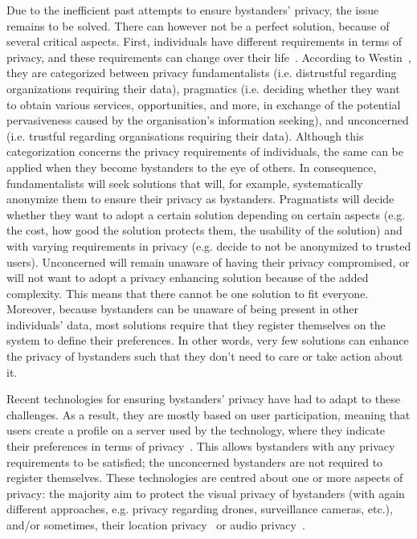 \documentclass[conference]{IEEEtran}
\begin{document}
Due to the inefficient past attempts to ensure bystanders' privacy, the issue remains to be solved. There can however not be a perfect solution, because of several critical aspects. First, individuals have different requirements in terms of privacy, and these requirements can change over their life~\cite{shu2016cardea}. According to Westin~\cite{langheinrich2009privacy}, they are categorized between privacy fundamentalists (i.e. distrustful regarding organizations requiring their data), pragmatics (i.e. deciding whether they want to obtain various services, opportunities, and more, in exchange of the potential pervasiveness caused by the organisation's information seeking), and unconcerned (i.e. trustful regarding organisations requiring their data). Although this categorization concerns the privacy requirements of individuals, the same can be applied when they become bystanders to the eye of others. In consequence, fundamentalists will seek solutions that will, for example, systematically anonymize them to ensure their privacy as bystanders. Pragmatists will decide whether they want to adopt a certain solution depending on certain aspects (e.g. the cost, how good the solution protects them, the usability of the solution) and with varying requirements in privacy (e.g. decide to not be anonymized to trusted users). Unconcerned will remain unaware of having their privacy compromised, or will not want to adopt a privacy enhancing solution because of the added complexity. This means that there cannot be one solution to fit everyone. Moreover, because bystanders can be unaware of being present in other individuals' data, most solutions require that they register themselves on the system to define their preferences. In other words, very few solutions can enhance the privacy of bystanders such that they don't need to care or take action about it.

Recent technologies for ensuring bystanders' privacy have had to adapt to these challenges. As a result, they are mostly based on user participation, meaning that users create a profile on a server used by the technology, where they indicate their preferences in terms of privacy~\cite{chinomi2008PriSurv, shu2016cardea}. This allows bystanders with any privacy requirements to be satisfied; the unconcerned bystanders are not required to register themselves. These technologies are centred about one or more aspects of privacy: the majority aim to protect the visual privacy of bystanders (with again different approaches, e.g. privacy regarding drones, surveillance cameras, etc.), and/or sometimes, their location privacy~\cite{olteanu2018consensual} or audio privacy~\cite{larson2011accurate}. 
\end{document}
